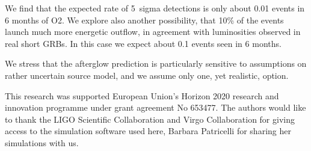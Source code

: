 \documentclass[11pt]{article}
\begin{document}
We find that the expected rate of 5~sigma detections is only about
0.01 events in 6 months of O2. We explore also another
possibility, that 10\% of the events launch much more energetic
outflow, in agreement with luminosities observed in real short
GRBs. In this case we expect about 0.1 events seen in 6 months.

We stress that the afterglow prediction is particularly sensitive to
assumptions on rather uncertain source model, and we assume only
one, yet realistic, option.

\vspace{10mm}


{\linespread{0.1} \footnotesize This research was supported European Union’s Horizon 2020 research and
  innovation programme under grant agreement No 653477. The authors would like
  to thank the LIGO Scientific Collaboration and Virgo Collaboration for giving
  access to the simulation software used here, Barbara Patricelli for sharing
  her simulations with us.}


{\footnotesize
}
\end{document}
